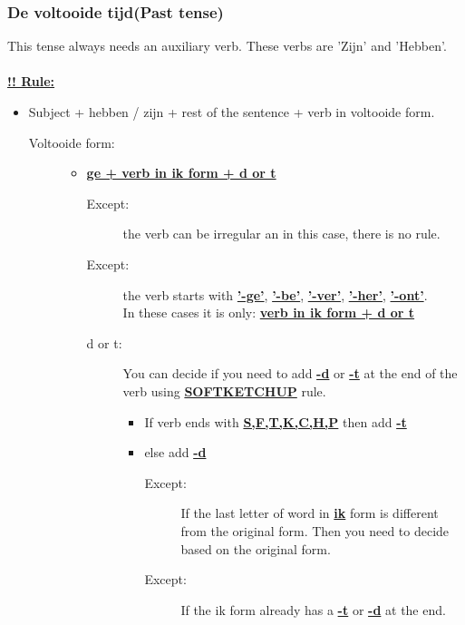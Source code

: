 \documentclass[a4paper,14pt]{extarticle}
\newcommand{\attention}[1]{\underline{\textbf{!! #1}}}
\newcommand{\emp}[1]{\underline{\textbf{#1}}}
\begin{document}
\subsubsection{De voltooide tijd(Past tense)}
This tense always needs an auxiliary verb. These verbs are 'Zijn' and 'Hebben'. \\ \\
\attention{Rule: } 
\begin{itemize}
\item Subject + hebben / zijn + rest of the sentence + verb in voltooide form. 
    \begin{description}
        \item[Voltooide form:] \hfill   
        \begin{itemize}
        \item \emp{ge + verb in ik form + d or t}
            \begin{description}
            \item[Except:] the verb can be irregular an in this case, there is no rule.
            \item[Except:] the verb starts with \emp{'-ge'}, \emp{'-be'}, \emp{'-ver'}, \emp{'-her'}, \emp{'-ont'}. \\ In these cases it is only: \emp{verb in ik form + d or t}  
            \item[d or t:] You can decide if you need to add \emp{-d} or \emp{-t} at the end of the verb using \emp{SOFTKETCHUP} rule.
                \begin{itemize}
                \item If verb ends with \emp{S,F,T,K,C,H,P} then add \emp{-t}
                \item else add \emp{-d}
                    \begin{description}
                    \item[Except:] If the last letter of word in \emp{ik} form is different from the original form. Then you need to decide based on the original form.
                    \item[Except:] If the ik form already has a \emp{-t} or \emp{-d} at the end.
                    \end{description}
                \end{itemize}
            \end{description}
        \end{itemize}
    \end{description}
\end{itemize}
\newpage
\end{document}

